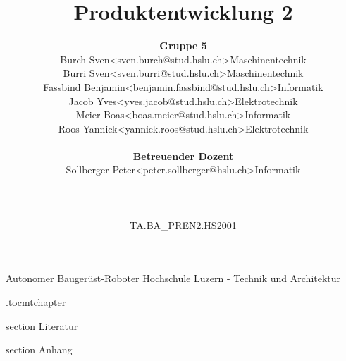 \documentclass[oneside]{modern}
\title{Produktentwicklung 2}
\author{
\begin{tabular}{ l l l}
  \textbf{Gruppe 5} && \\
  Burch Sven & <sven.burch@stud.hslu.ch> & Maschinentechnik\\
  Burri Sven & <sven.burri@stud.hslu.ch> & Maschinentechnik \\
  Fassbind Benjamin & <benjamin.fassbind@stud.hslu.ch> & Informatik \\
  Jacob Yves & <yves.jacob@stud.hslu.ch> & Elektrotechnik\\
  Meier Boas & <boas.meier@stud.hslu.ch> & Informatik\\
  Roos Yannick & <yannick.roos@stud.hslu.ch> & Elektrotechnik \\
  \\
  \textbf{Betreuender Dozent} && \\
  Sollberger Peter & <peter.sollberger@hslu.ch> & Informatik \\
  \\
  \\
  \\
  TA.BA\_PREN2.HS2001 &&\\
\end{tabular}
}
\begin{document}
   \renewcommand{\thesection}{\arabic{section}}
   \makeatletter
   \g@addto@macro{\UrlBreaks}{\UrlOrds}
   \makeatother
   


  \nocite{*}

  \firstpage
    {Autonomer Baugerüst-Roboter}
    {Hochschule Luzern - Technik und Architektur}
    {\theauthor}

  
  
  
  \newpage
  \etocdepthtag.toc{mtchapter}
  \addtableofcontents
  
  \newpage
  \listoffigures
  
  \newpage
  \listoftables

  \newpage
  
  

  
  
  
  
  
  
  
  
  
  
  
  
  
  


  \newpage
  \addglossary

  \newpage
    {section}
    {Literatur}

  \printbibliography[
    heading=subbibliography
  ]

    {section}
    {Anhang}
    
  
\end{document}
